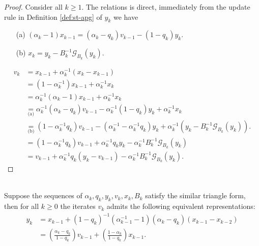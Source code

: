 \documentclass[12pt]{article}
\begin{document}
    \begin{proof}
        Consider all $k \ge 1$. 
        The relations is direct, immediately from the update rule in Definition \ref{def:st-apg} of $y_k$ we have
        \begin{enumerate}[nosep]
            \item[(a)] $(\alpha_k - 1)x_{k - 1} = (\alpha_k - q_k)v_{k - 1} - (1 - q_k)y_k$. 
            \item[(b)] $x_k = y_k - B_k^{-1}\mathcal G_{B_k}(y_k)$. 
        \end{enumerate}
        \begin{align*}
            v_k &= x_{k - 1} + \alpha_k^{-1}(x_k - x_{k - 1})
            \\
            &= (1 - \alpha_k^{-1})x_{k - 1} + \alpha_k^{-1}x_k
            \\
            &= \alpha_k^{-1}(\alpha_k - 1)x_{k - 1} + \alpha_k^{-1}x_k
            \\
            &\underset{\text{(a)}}{=} \alpha_k^{-1}(\alpha_k - q_k)v_{k - 1} - \alpha_{k}^{-1}(1 - q_k)y_k 
            + \alpha_k^{-1}x_k
            \\
            &\underset{\text{(b)}}{=} (1 - \alpha_k^{-1}q_k) v_{k - 1} - (\alpha_k^{-1} - \alpha_k^{-1}q_k)y_k
            + \alpha_k^{-1}(y_k - B_k^{-1}\mathcal G_{B_k}(y_k)). 
            \\
            &= 
            (1 - \alpha_k^{-1}q_k) v_{k - 1} + \alpha_k^{-1}q_ky_k
            - \alpha_k^{-1}B_k^{-1}\mathcal G_{B_k}(y_k)
            \\
            &= v_{k - 1} + \alpha_k^{-1}q_k(y_k - v_{k - 1}) - \alpha_{k}^{-1}B_k^{-1}\mathcal G_{B_k}(y_k). 
        \end{align*}
    \end{proof}
    \begin{lemma}\;\label{lemma:st-iterates-alt-form-part2}\\
        Suppose the sequences of $\alpha_k, q_k, y_k, v_k, x_k, B_k$ satisfy the similar triangle form, then for all $k \ge 0$ the iterates $v_k$ admits the following equivalent representations: 
        \begin{align*}
            y_k &= 
            x_{k -1} + (1 - q_k)^{-1}(\alpha_{k - 1}^{-1} - 1)(\alpha_k - q_k)(x_{k - 1} - x_{k - 2})
            \\
            &= \left(\frac{\alpha_k - q_k}{1 - q_k}\right)v_{k - 1} + \left(\frac{1 - \alpha_k}{1 - q_k}\right) x_{k - 1}. 
        \end{align*}
    \end{lemma}
\end{document}
